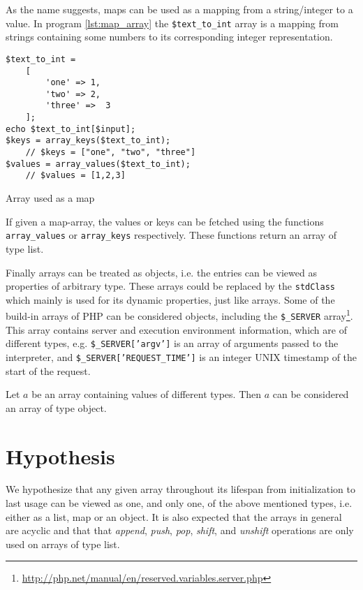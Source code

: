 As the name suggests, maps can be used as a mapping from a string/integer to a value. In program \ref{lst:map_array} the \texttt{\$text\_to\_int} array is a mapping from strings containing some numbers to its corresponding integer representation. 

\begin{program}[ht]
\begin{lstlisting}
$text_to_int = 
    [ 
        'one' => 1,
        'two' => 2,
        'three' =>  3
    ];
echo $text_to_int[$input]; 
$keys = array_keys($text_to_int);
    // $keys = ["one", "two", "three"]
$values = array_values($text_to_int);
    // $values = [1,2,3]
\end{lstlisting}
\caption{Array used as a map}
\label{lst:map_array}
\end{program}

If given a map-array, the values or keys can be fetched using the functions \texttt{array\_values} or \texttt{array\_keys} respectively. These functions return an array of type list. 

Finally arrays can be treated as objects, i.e. the entries can be viewed as properties of arbitrary type. These arrays could be replaced by the \texttt{stdClass} which mainly is used for its dynamic properties, just like arrays. Some of the build-in arrays of PHP can be considered objects, including the \texttt{\$\_SERVER} array\footnote{\url{http://php.net/manual/en/reserved.variables.server.php}}. This array contains server and execution environment information, which are of different types, e.g. \texttt{\$\_SERVER['argv']} is an array of arguments passed to the interpreter, and \texttt{\$\_SERVER['REQUEST\_TIME']} is an integer UNIX timestamp of the start of the request. 

\begin{definition}
Let $a$ be an array containing values of different types. Then $a$ can be considered an array of type object.
\end{definition}


\section{Hypothesis}
\label{sec:dynhypothesis}
We hypothesize that any given array throughout its lifespan from initialization to last usage can be viewed as one, and only one, of the above mentioned types, i.e. either as a list, map or an object. It is also expected that the arrays in general are acyclic and that that \emph{append}, \textit{push}, \textit{pop}, \textit{shift}, and \textit{unshift} operations are only used on arrays of type list.

